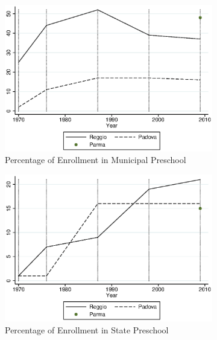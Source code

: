 \begin{figure}[H]
\begin{subfigure}[t]{0.49\textwidth}
          \includegraphics[width=\textwidth]{../../output/image/enroll_per_muni_graph.eps} 
        \caption{Percentage of Enrollment in Municipal Preschool}        
        \end{subfigure}
        \begin{subfigure}[t]{0.49\textwidth}
          \includegraphics[width=\textwidth]{../../output/image/enroll_per_stat_graph.eps}
            \caption{Percentage of Enrollment in State Preschool}       
        \end{subfigure}
      \begin{subfigure}[ht]{0.48\textwidth}

\end{subfigure}
\end{figure}
